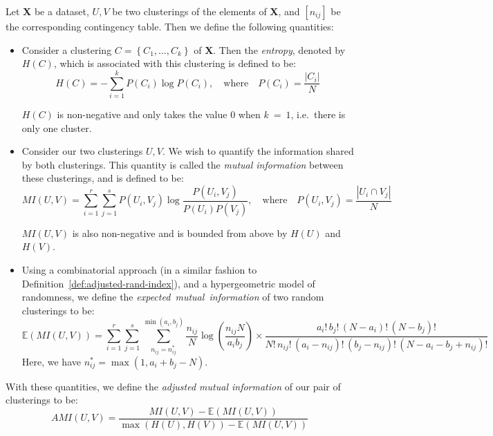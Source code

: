 \begin{definition}\label{def:adjusted-mutual-info}
    Let \textbf{X} be a dataset, \(U, V\) be two clusterings of the elements of
    \textbf{X}, and \(\left[n_{ij}\right]\) be the corresponding contingency
    table. Then we define the following quantities:
    \begin{itemize}
        \item Consider a clustering \(C = \left\{C_1, \ldots, C_k\right\}\) of
            \textbf{X}. Then the \emph{entropy}, denoted by \(H(C)\), which is
            associated with this clustering is defined to be:
            \[
                H(C) = - \sum_{i=1}^k P(C_i)\log P(C_i), \quad \text{where}
                \quad P(C_i) = \frac{\left|C_i\right|}{N}
            \]

            \(H(C)\) is non-negative and only takes the value \(0\) when
            \(k~=~1\), i.e.\ there is only one cluster.

        \item Consider our two clusterings \(U, V\). We wish to quantify the
            information shared by both clusterings. This quantity is called the
            \emph{mutual information} between these clusterings, and is defined
            to be:
            \[
                MI(U, V) = \sum_{i=1}^r \sum_{j=1}^s P(U_i, V_j)\log
                \frac{P(U_i, V_j)}{P(U_i)P(V_j)}, \quad \text{where} \quad P(U_i,
                V_j) = \frac{\left|U_i \cap V_j\right|}{N}
            \]

            \(MI(U, V)\) is also non-negative and is bounded from above by
            \(H(U)\) and \(H(V)\).

        \item Using a combinatorial approach (in a similar fashion to
            Definition~\ref{def:adjusted-rand-index}), and a hypergeometric
            model of randomness, we define the
            \emph{expected~mutual~information} of two random clusterings to be:
            \[
                \mathbb{E}\left(MI(U, V)\right) = \sum_{i=1}^r \sum_{j=1}^s
                \sum_{n_{ij}=n_{ij}^*}^{\min(a_i, b_j)} \frac{n_{ij}}{N}\log
                \left(\frac{n_{ij} N}{a_i b_j}\right) \times \frac{a_i!\, b_j!\,
                \left(N - a_i\right)!\, \left(N - b_j\right)!}{N!\, n_{ij}!\,
                \left(a_i - n_{ij}\right)!\, \left(b_j - n_{ij}\right)!\,
                \left(N - a_i - b_j + n_{ij}\right)!}
            \]
            Here, we have \(n_{ij}^* = \max(1, a_i + b_j - N)\).\\
    \end{itemize}
    
    With these quantities, we define the \emph{adjusted mutual information} of
    our pair of clusterings to be:
    \[
        AMI(U, V) = \frac{MI(U, V) - \mathbb{E}\left(MI(U, V)\right)}{\max
        \left(H(U), H(V)\right) - \mathbb{E}\left(MI(U, V)\right)}
    \]
\end{definition}

